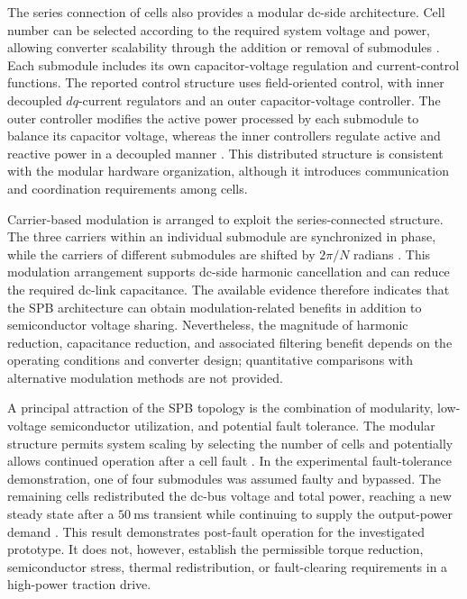 The series connection of cells also provides a modular dc-side architecture. Cell number can be selected according to the required system voltage and power, allowing converter scalability through the addition or removal of submodules \cite{Jin2017}. Each submodule includes its own capacitor-voltage regulation and current-control functions. The reported control structure uses field-oriented control, with inner decoupled \(dq\)-current regulators and an outer capacitor-voltage controller. The outer controller modifies the active power processed by each submodule to balance its capacitor voltage, whereas the inner controllers regulate active and reactive power in a decoupled manner \cite{Jin2017}. This distributed structure is consistent with the modular hardware organization, although it introduces communication and coordination requirements among cells.

Carrier-based modulation is arranged to exploit the series-connected structure. The three carriers within an individual submodule are synchronized in phase, while the carriers of different submodules are shifted by \(2\pi/N\) radians \cite{Jin2017}. This modulation arrangement supports dc-side harmonic cancellation and can reduce the required dc-link capacitance. The available evidence therefore indicates that the SPB architecture can obtain modulation-related benefits in addition to semiconductor voltage sharing. Nevertheless, the magnitude of harmonic reduction, capacitance reduction, and associated filtering benefit depends on the operating conditions and converter design; quantitative comparisons with alternative modulation methods are not provided. %

A principal attraction of the SPB topology is the combination of modularity, low-voltage semiconductor utilization, and potential fault tolerance. The modular structure permits system scaling by selecting the number of cells and potentially allows continued operation after a cell fault \cite{Jin2017}. In the experimental fault-tolerance demonstration, one of four submodules was assumed faulty and bypassed. The remaining cells redistributed the dc-bus voltage and total power, reaching a new steady state after a \(50~\mathrm{ms}\) transient while continuing to supply the output-power demand \cite{Jin2017}. This result demonstrates post-fault operation for the investigated prototype. It does not, however, establish the permissible torque reduction, semiconductor stress, thermal redistribution, or fault-clearing requirements in a high-power traction drive. %

